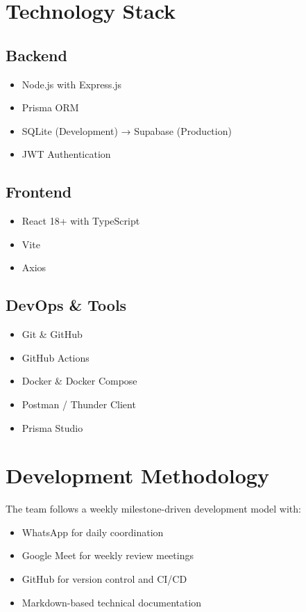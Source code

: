 \documentclass[12pt,a4paper]{article}
\begin{document}
\section*{Technology Stack}

\subsection*{Backend}
\begin{itemize}
    \item Node.js with Express.js
    \item Prisma ORM
    \item SQLite (Development) → Supabase (Production)
    \item JWT Authentication
\end{itemize}

\subsection*{Frontend}
\begin{itemize}
    \item React 18+ with TypeScript
    \item Vite
    \item Axios
\end{itemize}

\subsection*{DevOps \& Tools}
\begin{itemize}
    \item Git \& GitHub
    \item GitHub Actions
    \item Docker \& Docker Compose
    \item Postman / Thunder Client
    \item Prisma Studio
\end{itemize}

\section*{Development Methodology}

The team follows a weekly milestone-driven development model with:

\begin{itemize}
    \item WhatsApp for daily coordination
    \item Google Meet for weekly review meetings
    \item GitHub for version control and CI/CD
    \item Markdown-based technical documentation
\end{itemize}
\end{document}
